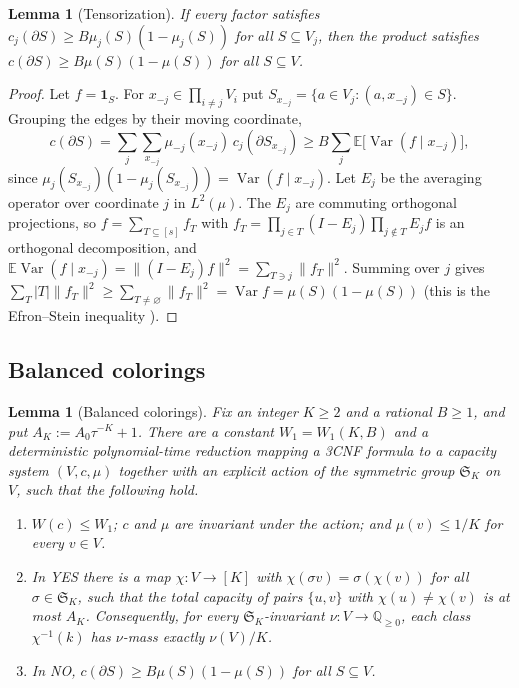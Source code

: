 \documentclass[11pt,letterpaper]{article}
\newtheorem{lemma}[theorem]{Lemma}
\theoremstyle{definition}
\theoremstyle{remark}
\newcommand{\Q}{\mathbb Q}
\newcommand{\E}{\mathbb E}
\newcommand{\ind}{\mathbf 1}
\DeclareMathOperator{\Var}{Var}
\begin{document}
\begin{lemma}[Tensorization]\label{lem:tensor}
If every factor satisfies \(c_j(\partial S)\ge B\mu_j(S)(1-\mu_j(S))\) for all
\(S\subseteq V_j\), then the product satisfies
\(c(\partial S)\ge B\mu(S)(1-\mu(S))\) for all \(S\subseteq V\).
\end{lemma}

\begin{proof}
Let \(f=\ind_S\). For \(x_{-j}\in\prod_{i\ne j}V_i\) put
\(S_{x_{-j}}=\{a\in V_j:(a,x_{-j})\in S\}\). Grouping the edges by their
moving coordinate,
\[
c(\partial S)=\sum_j\sum_{x_{-j}}\mu_{-j}(x_{-j})\,c_j(\partial S_{x_{-j}})
\ge B\sum_j\E\bigl[\Var(f\mid x_{-j})\bigr],
\]
since \(\mu_j(S_{x_{-j}})(1-\mu_j(S_{x_{-j}}))=\Var(f\mid x_{-j})\). Let
\(E_j\) be the averaging operator over coordinate \(j\) in \(L^2(\mu)\). The
\(E_j\) are commuting orthogonal projections, so \(f=\sum_{T\subseteq[s]}f_T\)
with \(f_T=\prod_{j\in T}(I-E_j)\prod_{j\notin T}E_jf\) is an orthogonal
decomposition, and \(\E\Var(f\mid x_{-j})=\|(I-E_j)f\|^2=\sum_{T\ni
j}\|f_T\|^2\). Summing over \(j\) gives
\(\sum_T|T|\|f_T\|^2\ge\sum_{T\ne\varnothing}\|f_T\|^2=\Var f=\mu(S)(1-\mu(S))\)
(this is the Efron--Stein inequality \cite{es81}).
\end{proof}

\subsection{Balanced colorings}

\begin{lemma}[Balanced colorings]\label{lem:balance}
Fix an integer \(K\ge2\) and a rational \(B\ge1\), and put
\(A_K:=A_0\tau^{-K}+1\). There are a constant \(W_1=W_1(K,B)\) and a
deterministic polynomial-time reduction mapping a 3CNF formula to a capacity
system \((V,c,\mu)\) together with an explicit action of the symmetric group
\(\mathfrak S_K\) on \(V\), such that the following hold.
\begin{enumerate}[label=\textup{(\roman*)}]
\item \(W(c)\le W_1\); \(c\) and \(\mu\) are invariant under the action; and
\(\mu(v)\le1/K\) for every \(v\in V\).
\item In YES there is a map \(\chi:V\to[K]\) with
\(\chi(\sigma v)=\sigma(\chi(v))\) for all \(\sigma\in\mathfrak S_K\), such
that the total capacity of pairs \(\{u,v\}\) with \(\chi(u)\ne\chi(v)\) is
at most \(A_K\). Consequently, for every \(\mathfrak S_K\)-invariant
\(\nu:V\to\Q_{\ge0}\), each class \(\chi^{-1}(k)\) has \(\nu\)-mass exactly
\(\nu(V)/K\).
\item In NO, \(c(\partial S)\ge B\mu(S)(1-\mu(S))\) for all \(S\subseteq V\).
\end{enumerate}
\end{lemma}
\end{document}
